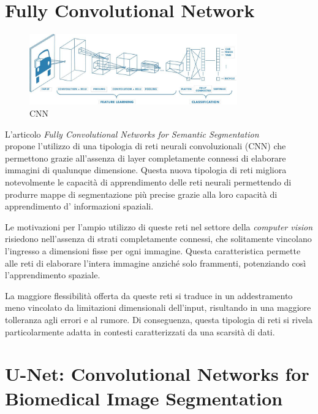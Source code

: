 \section{Fully Convolutional Network}
\begin{figure}[!ht]
	\begin{center}
		\includegraphics[width=0.8\textwidth]{Immagini/cnn.png}
	\end{center}
	\caption{CNN}
	\label{fig:cnn}
\end{figure}




L'articolo \textit{Fully Convolutional Networks for Semantic Segmentation} \\
\cite{long2015fully} propone l'utilizzo di una tipologia di reti neurali
convoluzionali (CNN) che permettono grazie all'assenza di layer completamente
connessi di elaborare immagini di qualunque dimensione. Questa nuova tipologia
di reti migliora notevolmente le capacità di apprendimento delle reti neurali
permettendo di produrre mappe di segmentazione più precise grazie alla loro
capacità di apprendimento d' informazioni spaziali.

Le motivazioni per l'ampio utilizzo di queste reti nel settore della \textit{computer vision}
risiedono nell'assenza di strati completamente connessi, che solitamente vincolano l'ingresso a
dimensioni fisse per ogni immagine. Questa caratteristica permette alle reti di elaborare l'intera
immagine anziché solo frammenti, potenziando così l'apprendimento spaziale.

La maggiore flessibilità offerta da queste reti si traduce in un addestramento meno vincolato da
limitazioni dimensionali dell'input, risultando in una maggiore tolleranza agli errori e al rumore.
Di conseguenza, questa tipologia di reti si rivela particolarmente adatta in contesti caratterizzati
da una scarsità di dati.


\section{U-Net: Convolutional Networks for Biomedical Image Segmentation}

